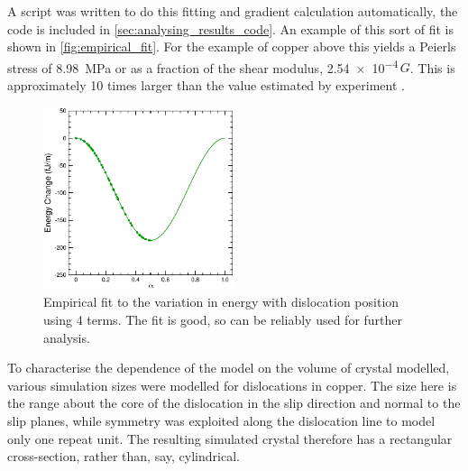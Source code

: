 A script was written to do this fitting and gradient calculation automatically, the code is included in \autoref{sec:analysing_results_code}. An example of this sort of fit is shown in \autoref{fig:empirical_fit}. For the example of copper above this yields a Peierls stress of \SI{8.98}{\mega\pascal} or as a fraction of the shear modulus, \num{2.54e-4}\,$G$. This is approximately 10 times larger than the value estimated by experiment \cite{Wang1996}.

\begin{figure}
\centering
\includegraphics[width=0.5\textwidth]{Empirical_Fit}
\caption[Empirical fit to the variation in energy with dislocation position.]{Empirical fit to the variation in energy with dislocation position using 4 terms. The fit is good, so can be reliably used for further analysis.\label{fig:empirical_fit}}
\end{figure}


To characterise the dependence of the model on the volume of crystal modelled, various simulation sizes were modelled for dislocations in copper. The size here is the range about the core of the dislocation in the slip direction and normal to the slip planes, while symmetry was exploited along the dislocation line to model only one repeat unit. The resulting simulated crystal therefore has a rectangular cross-section, rather than, say, cylindrical.


